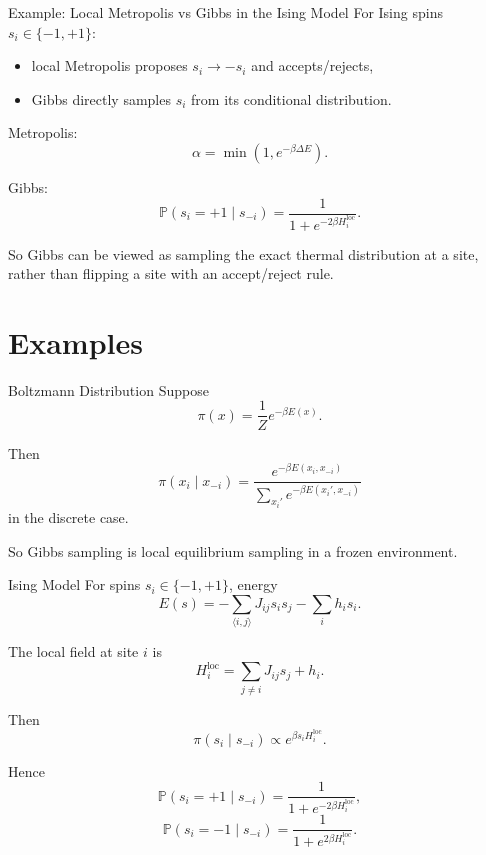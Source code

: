 \documentclass[aspectratio=169]{beamer}
\begin{document}
\begin{frame}{Example: Local Metropolis vs Gibbs in the Ising Model}
For Ising spins \(s_i\in\{-1,+1\}\):
\begin{itemize}
    \item local Metropolis proposes \(s_i\to -s_i\) and accepts/rejects,
    \item Gibbs directly samples \(s_i\) from its conditional distribution.
\end{itemize}

Metropolis:
\[
\alpha=\min(1,e^{-\beta \Delta E}).
\]

Gibbs:
\[
\mathbb{P}(s_i=+1\mid s_{-i})
=
\frac{1}{1+e^{-2\beta H_i^{\mathrm{loc}}}}.
\]

So Gibbs can be viewed as sampling the exact thermal distribution at a site, rather than flipping a site with an accept/reject rule.
\end{frame}

\section{Examples}

\begin{frame}{Boltzmann Distribution}
Suppose
\[
\pi(x)=\frac{1}{Z}e^{-\beta E(x)}.
\]

Then
\[
\pi(x_i\mid x_{-i})
=
\frac{e^{-\beta E(x_i,x_{-i})}}
{\sum_{x_i'}e^{-\beta E(x_i',x_{-i})}}
\]
in the discrete case.

So Gibbs sampling is local equilibrium sampling in a frozen environment.
\end{frame}

\begin{frame}{Ising Model}
For spins \(s_i\in\{-1,+1\}\), energy
\[
E(s)=-\sum_{\langle i,j\rangle}J_{ij}s_i s_j-\sum_i h_i s_i.
\]

The local field at site \(i\) is
\[
H_i^{\mathrm{loc}}=\sum_{j\neq i}J_{ij}s_j+h_i.
\]

Then
\[
\pi(s_i\mid s_{-i})\propto e^{\beta s_i H_i^{\mathrm{loc}}}.
\]

Hence
\[
\mathbb{P}(s_i=+1\mid s_{-i})
=
\frac{1}{1+e^{-2\beta H_i^{\mathrm{loc}}}},
\]
\[
\mathbb{P}(s_i=-1\mid s_{-i})
=
\frac{1}{1+e^{2\beta H_i^{\mathrm{loc}}}}.
\]
\end{frame}
\end{document}
